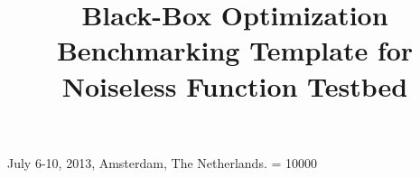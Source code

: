 \documentclass{sig-alternate}
\begin{document}
%
 {July 6-10, 2013, Amsterdam, The Netherlands.}
\widowpenalty = 10000

\title{Black-Box Optimization Benchmarking Template for Noiseless Function
Testbed
}


%
%
%
%
%
\end{document}
